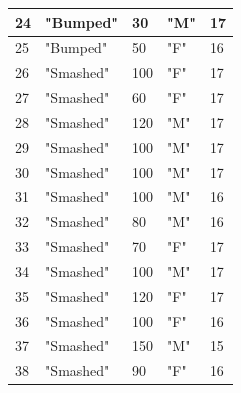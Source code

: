 \documentclass[11pt]{article}
\begin{document}
\begin{table}[!ht]
\begin{tabular}{|l|l|l|l|l|}
      24 & "Bumped" & 30 & "M" & 17 \\ \hline
      25 & "Bumped" & 50 & "F" & 16 \\ \hline
      26 & "Smashed" & 100 & "F" & 17 \\ \hline
      27 & "Smashed" & 60 & "F" & 17 \\ \hline
      28 & "Smashed" & 120 & "M" & 17 \\ \hline
      29 & "Smashed" & 100 & "M" & 17 \\ \hline
      30 & "Smashed" & 100 & "M" & 17 \\ \hline
      31 & "Smashed" & 100 & "M" & 16 \\ \hline
      32 & "Smashed" & 80 & "M" & 16 \\ \hline
      33 & "Smashed" & 70 & "F" & 17 \\ \hline
      34 & "Smashed" & 100 & "M" & 17 \\ \hline
      35 & "Smashed" & 120 & "F" & 17 \\ \hline
      36 & "Smashed" & 100 & "F" & 16 \\ \hline
      37 & "Smashed" & 150 & "M" & 15 \\ \hline
      38 & "Smashed" & 90 & "F" & 16 \\ \hline
  \end{tabular}
~\label{tab:rawData}
\end{table}
\end{document}

